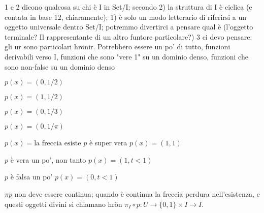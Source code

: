 \documentclass{amsart}
\begin{document}
1 e 2 dicono qualcosa su chi è I in Set/I; secondo 2) la struttura di I è ciclica (e contata in base 12, chiaramente);  1) è solo un modo letterario di riferirsi a un oggetto universale dentro Set/I; potremmo divertirci a pensare qual è (l'oggetto terminale? Il rappresentante di un altro funtore particolare?)
3 ci devo pensare: gli ur sono particolari hrönir. Potrebbero essere un po' di tutto, funzioni derivabili verso I, funzioni che sono "vere 1" su un dominio denso, funzioni che sono non-false su un dominio denso

$p(x) = (0,1/2)$

$p(x) = (1,1/2)$


$p(x) = (0,1/3)$

$p(x) = (0,1/\pi)$

$p(x) = \text{la freccia esiste}$
$p$ è super vera
$p(x)=(1,1)$

$p$ è vera un po', non tanto
$p(x) =(1,t<1)$

$p$ è falsa un po'
$p(x) =(0,t<1)$

$\pi p$ non deve essere continua; quando è continua la freccia perdura nell'esistenza, e questi oggetti divini si chiamano hrön
$\pi_I \circ p : U \to \{0,1\}\times I \to I$.
\end{document}
